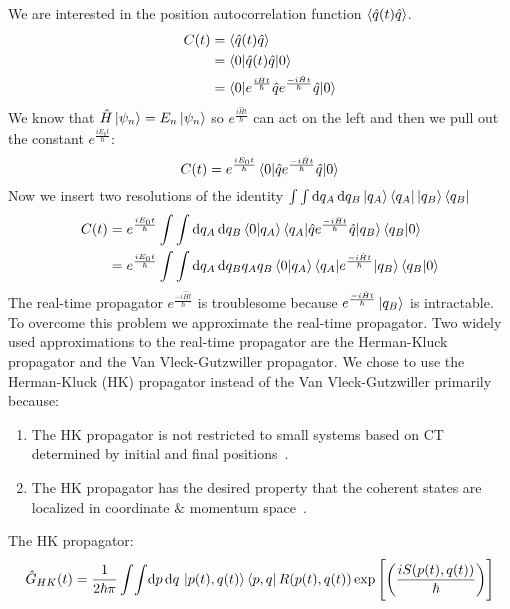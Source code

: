 \documentclass[12pt,letterpaper,oneside,final,titlepage]{article}               %
\numberwithin{equation}{section} %
\newcommand{\emiHt}{e^{\frac{-i\hat{H}t}{\hbar}}}
\newcommand{\eiHt}{e^{\frac{i\hat{H}t}{\hbar}}}
\newcommand{\expb}[1]{\ensuremath{\exp{\left[ #1 \right]}}}
\begin{document}
We are interested in the position autocorrelation function $\braket{\hat{q}(t)\hat{q}}$. 
\begin{align}
    C(t) &= \braket{\hat{q}(t)\hat{q}}
    \\   &= \braket{0|\hat{q}(t)\hat{q}|0}
    \\   &= \braket{0|\eiHt\hat{q}\emiHt\hat{q}|0}
\end{align}
We know that $\hat{H}\ket{\psi_{n}} = E_{n}\ket{\psi_{n}}$ so $\eiHt$ can act on the left and 
then we pull out the constant $e^{\frac{iE_{0}t}{\hbar}}$:\\
\begin{equation}
    C(t) = e^{\frac{iE_{0}t}{\hbar}}\braket{0|\hat{q}\emiHt\hat{q}|0}
\end{equation}
Now we insert two resolutions of the identity
$\int\int \dif q_{A}\dif q_{B} \ket{q_{A}}\bra{q_{A}}\ket{q_{B}}\bra{q_{B}}$
\begin{align}
    C(t) &= e^{\frac{iE_{0}t}{\hbar}}\int\int \dif q_{A}\dif q_{B} 
    \braket{0|q_{A}}\braket{q_{A}|\hat{q}\emiHt\hat{q}|q_{B}}\braket{q_{B}|0}
    \\   &= e^{\frac{iE_{0}t}{\hbar}}\int\int \dif q_{A}\dif q_{B} 
    q_{A}q_{B}\braket{0|q_{A}}\braket{q_{A}|\emiHt|q_{B}}\braket{q_{B}|0}
    \label{eq:cor_ins}
\end{align}
The real-time propagator $\emiHt$ is troublesome because $\emiHt\ket{q_{B}}$ is intractable. 
To overcome this problem we approximate the real-time propagator.
Two widely used approximations to the real-time propagator are the Herman-Kluck propagator and the Van Vleck-Gutzwiller propagator.
We chose to use the Herman-Kluck (HK) propagator instead of the Van Vleck-Gutzwiller primarily because:
\begin{enumerate}
    \item The HK propagator is not restricted to small systems based on CT determined by initial and final positions~\cite{kay2006herman}.
    \item The HK propagator has the desired property that the coherent states are localized in coordinate $\&$ momentum space~\cite{kay2006herman}.
\end{enumerate}
The HK propagator:
\begin{equation}\label{eq:HKprop}
    \hat{G}_{HK}(t) = \frac{1}{2\hbar\pi}\int\!\int \!\dif p\,\!\dif q\, 
    \ket{p(t), q(t)}\bra{p,q} R(p(t),q(t))
    \expb{\left(\frac{iS(p(t),q(t))}{\hbar}\right)}
\end{equation}
\end{document}

